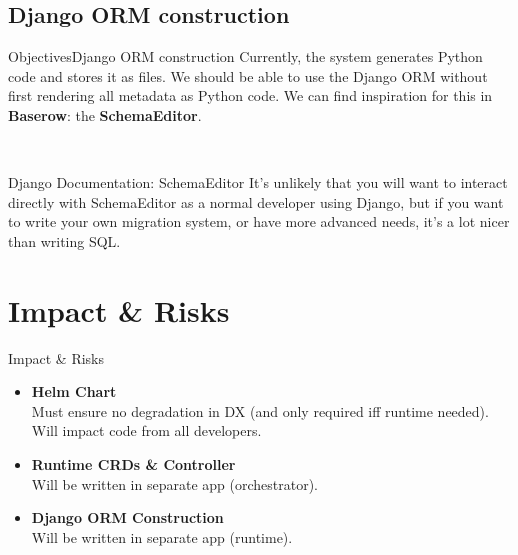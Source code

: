 \documentclass{beamer}
\begin{document}
\subsection{Django ORM construction}

\begin{frame}{Objectives}{Django ORM construction}
    Currently, the system generates Python code and stores it
    as files. We should be able to use the Django ORM without
    first rendering all metadata as Python code. We can find
    inspiration for this in \textbf{Baserow}: 
    the \textbf{SchemaEditor}.

    ~

    \begin{block}{Django Documentation: SchemaEditor}
        It's unlikely that you will want to interact directly with SchemaEditor as a normal developer using Django, but if you want to write your own migration system, or have more advanced needs, it's a lot nicer than writing SQL.
    \end{block}
\end{frame}

\section{Impact \& Risks}

\begin{frame}{Impact \& Risks}
    \begin{itemize}
        \item {
            \textbf{Helm Chart} \\
            Must ensure no degradation in DX (and 
            only required iff runtime needed). Will 
            impact code from all developers. 
        }
        \item {
            \textbf{Runtime CRDs \& Controller} \\
            Will be written in separate app (orchestrator).
        }
        \item {
            \textbf{Django ORM Construction} \\ 
            Will be written in separate app (runtime).
        }
    \end{itemize}
\end{frame}

%
%
\end{document}

